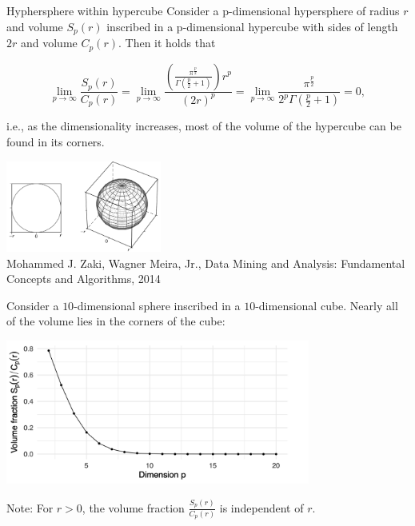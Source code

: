 \begin{vbframe}{Hyphersphere within hypercube}
Consider a p-dimensional hypersphere of radius $r$ and volume $S_p(r)$ inscribed in a p-dimensional hypercube with sides of length $2r$ and volume $C_p(r)$. Then it holds that 
\begin{footnotesize}
$$\lim_{p\rightarrow \infty} \frac{S_p(r)}{C_p(r)} = \lim_{p\rightarrow \infty}
\frac{\left( \frac{\pi^{\frac{p}{2}}}{\Gamma(\frac{p}{2}+1)} \right)r^p}{(2r)^p} =
 \lim_{p\rightarrow \infty} \frac{\pi^{\frac{p}{2}}}{2^p\Gamma(\frac{p}{2}+1)} = 0,$$
\end{footnotesize}
i.e., as the dimensionality increases, most of the volume of the hypercube can be found in its corners.

\begin{center}
\includegraphics[height = 3cm, keepaspectratio]{figure_man/sphere_in_cube.png}\\
\scriptsize{Mohammed J. Zaki, Wagner Meira, Jr., Data Mining and Analysis: Fundamental Concepts and Algorithms, 2014}
\end{center}

\framebreak

Consider a $10$-dimensional sphere inscribed in a $10$-dimensional cube. Nearly all of the volume lies in the corners of the cube:
\medskip

\vspace*{0.1cm}
\begin{center}
\includegraphics[width = 10cm ]{figure_man/vol_dim.png}
\end{center}

\begin{footnotesize}
Note: For $r > 0$, the volume fraction $\frac{S_p(r)}{C_p(r)}$ is independent of 
$r$.
\end{footnotesize}

\end{vbframe}

